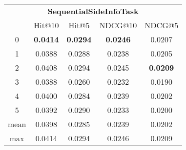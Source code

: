 \documentclass{article}
\begin{document}
 

\begin{tabular}{c|cccc}

\multicolumn{5}{c}{\textbf{SequentialSideInfoTask}} \\
\noalign{\smallskip}
\noalign{\smallskip}
\toprule
\multicolumn{1}{c}{Template ID} & \multicolumn{1}{|c}{Hit@10} & \multicolumn{1}{c}{Hit@5} & \multicolumn{1}{c}{NDCG@10} & \multicolumn{1}{c}{NDCG@5} \\
\midrule
0 & \textbf{0.0414} & \textbf{0.0294} & \textbf{0.0246} & 0.0207 \\
1 & 0.0388 & 0.0288 & 0.0238 & 0.0205 \\
2 & 0.0408 & 0.0294 & 0.0245 & \textbf{0.0209} \\
3 & 0.0388 & 0.0260 & 0.0232 & 0.0190 \\
4 & 0.0400 & 0.0284 & 0.0239 & 0.0202 \\
5 & 0.0392 & 0.0290 & 0.0233 & 0.0200 \\
\midrule
mean & 0.0398 & 0.0285 & 0.0239 & 0.0202 \\
max & 0.0414 & 0.0294 & 0.0246 & 0.0209 \\
\bottomrule

\end{tabular}
\end{document}
